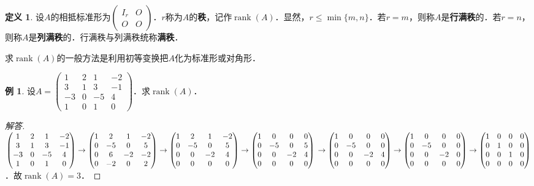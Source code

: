 \documentclass[a4paper,fontset=windows]{ctexbook}
\theoremstyle{definition}
\newtheorem{definition}{定义}[chapter]
\newtheorem{example}{例}[chapter]
\DeclareMathOperator{\rank}{rank}
\renewcommand{\le}{\leqslant}
\begin{document}
\begin{definition}\label{def4.2}
设$A$的相抵标准形为$\begin{pmatrix}I_r&O \\ O&O\end{pmatrix}$．$r$称为$A$的{\bf 秩}，记作$\rank(A)$．显然，$r\le\min\{m,n\}$．若$r=m$，则称$A$是{\bf 行满秩}的．若$r=n$，则称$A$是{\bf 列满秩}的．行满秩与列满秩统称{\bf 满秩}．
\end{definition}

求$\rank(A)$的一般方法是利用初等变换把$A$化为标准形或对角形．

\begin{example}
设$A=\begin{pmatrix}1&2&1&-2 \\ 3&1&3&-1 \\ -3&0&-5&4 \\ 1&0&1&0\end{pmatrix}$．求$\rank(A)$．
\end{example}

\begin{proof}[解答]
$\begin{pmatrix}1&2&1&-2 \\ 3&1&3&-1 \\ -3&0&-5&4 \\ 1&0&1&0\end{pmatrix}\to\begin{pmatrix}1&2&1&-2 \\ 0&-5&0&5 \\ 0&6&-2&-2 \\ 0&-2&0&2\end{pmatrix}\to\begin{pmatrix}1&2&1&-2 \\ 0&-5&0&5 \\ 0&0&-2&4 \\ 0&0&0&0\end{pmatrix}\to\begin{pmatrix}1&0&0&0 \\ 0&-5&0&5 \\ 0&0&-2&4 \\ 0&0&0&0\end{pmatrix} \\ \to\begin{pmatrix}1&0&0&0 \\ 0&-5&0&0 \\ 0&0&-2&4 \\ 0&0&0&0\end{pmatrix}\to\begin{pmatrix}1&0&0&0 \\ 0&-5&0&0 \\ 0&0&-2&0 \\ 0&0&0&0\end{pmatrix}\to\begin{pmatrix}1&0&0&0 \\ 0&1&0&0 \\ 0&0&1&0 \\ 0&0&0&0\end{pmatrix}$．故$\rank(A)=3$．
\end{proof}
\end{document}
